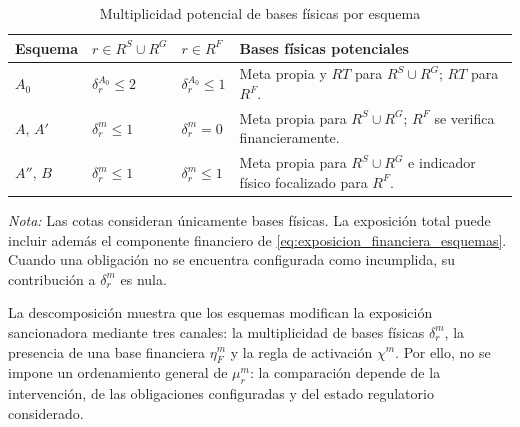 \begin{table}[t]
\centering
\caption{Multiplicidad potencial de bases físicas por esquema}
\label{tab:multiplicidad_bases_fisicas}
\scriptsize
\renewcommand{\arraystretch}{1.25}
\setlength{\tabcolsep}{3pt}

\begin{tabularx}{\columnwidth}{
@{}
>{\centering\arraybackslash}p{}
>{\centering\arraybackslash}p{}
>{\centering\arraybackslash}p{}
>{\raggedright\arraybackslash}X
@{}
}
\hline
\textbf{Esquema}
&
\textbf{\(r\in R^{S}\cup R^{G}\)}
&
\textbf{\(r\in R^{F}\)}
&
\textbf{Bases físicas potenciales}
\\
\hline

\(A_0\)
&
\(\delta_r^{A_0}\leq2\)
&
\(\delta_r^{A_0}\leq1\)
&
Meta propia y \(RT\) para \(R^{S}\cup R^{G}\); \(RT\) para \(R^{F}\).
\\[3pt]

\(A,\,A'\)
&
\(\delta_r^m\leq1\)
&
\(\delta_r^m=0\)
&
Meta propia para \(R^{S}\cup R^{G}\); \(R^{F}\) se verifica financieramente.
\\[3pt]

\(A'',\,B\)
&
\(\delta_r^m\leq1\)
&
\(\delta_r^m\leq1\)
&
Meta propia para \(R^{S}\cup R^{G}\) e indicador físico focalizado para \(R^{F}\).
\\

\hline
\end{tabularx}

\vspace{1mm}

\begin{minipage}{0.96\columnwidth}
\raggedright
\footnotesize
\textit{Nota:} Las cotas consideran únicamente bases físicas. La exposición total puede incluir además el componente financiero de \eqref{eq:exposicion_financiera_esquemas}. Cuando una obligación no se encuentra configurada como incumplida, su contribución a \(\delta_r^m\) es nula.
\end{minipage}

\end{table}

La descomposición muestra que los esquemas modifican la exposición sancionadora mediante tres canales: la multiplicidad de bases físicas \(\delta_r^m\), la presencia de una base financiera \(\eta_F^m\) y la regla de activación \(\chi^m\). Por ello, no se impone un ordenamiento general de \(\mu_r^m\): la comparación depende de la intervención, de las obligaciones configuradas y del estado regulatorio considerado.

